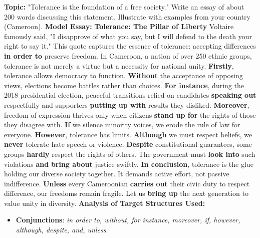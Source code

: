 \documentclass[11pt]{article}
\newcommand{\cle}[1]{{\popxbold\color{popdark}#1}}
\begin{document}
\begin{exoresolu}
    \textbf{Topic:} "Tolerance is the foundation of a free society." Write an essay of about 200 words discussing this statement. Illustrate with examples from your country (Cameroon).
    \tcblower
    \textbf{Model Essay:}
    \vspace{0.2cm}
    \noindent \textbf{Tolerance: The Pillar of Liberty}
    \vspace{0.2cm}
    \noindent Voltaire famously said, "I disapprove of what you say, but I will defend to the death your right to say it." This quote captures the essence of tolerance: accepting differences \textbf{in order to} preserve freedom. In Cameroon, a nation of over 250 ethnic groups, tolerance is not merely a virtue but a necessity for national unity.
    \vspace{0.2cm}
    \noindent \textbf{Firstly}, tolerance allows democracy to function. \textbf{Without} the acceptance of opposing views, elections become battles rather than choices. \textbf{For instance}, during the 2018 presidential election, peaceful transitions relied on candidates \textbf{speaking out} respectfully and supporters \textbf{putting up with} results they disliked. \textbf{Moreover}, freedom of expression thrives only when citizens \textbf{stand up for} the rights of those they disagree with. \textbf{If} we silence minority voices, we erode the \cle{rule of law} for everyone.
    \vspace{0.2cm}
    \noindent \textbf{However}, tolerance has limits. \textbf{Although} we must respect beliefs, we \textbf{never} tolerate hate speech or violence. \textbf{Despite} constitutional guarantees, some groups \textbf{hardly} respect the rights of others. The government must \textbf{look into} such violations \textbf{and} \textbf{bring about} justice swiftly.
    \vspace{0.2cm}
    \noindent \textbf{In conclusion}, tolerance is the glue holding our diverse society together. It demands active effort, not passive indifference. \textbf{Unless} every Cameroonian \textbf{carries out} their civic duty to respect difference, our freedoms remain fragile. Let us \textbf{bring up} the next generation to value unity in diversity.
    \vspace{0.3cm}
    \textbf{Analysis of Target Structures Used:}
    \begin{itemize}
        \item \textbf{Conjunctions}: \emph{in order to, without, for instance, moreover, if, however, although, despite, and, unless}.

\end{itemize}
\end{exoresolu}
\end{document}
